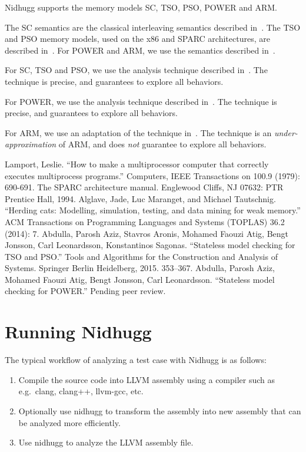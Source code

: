 \documentclass[a4paper]{article}
\begin{document}
Nidhugg supports the memory models SC, TSO, PSO, POWER and ARM.

The SC semantics are the classical interleaving semantics described
in~\cite{lamport1979make}. The TSO and PSO memory models, used on the
x86 and SPARC architectures, are described in~\cite{sparcv9}. For
POWER and ARM, we use the semantics described in~\cite{alglaveHerding}.

For SC, TSO and PSO, we use the analysis technique described
in~\cite{leonardssonSMCTSO}. The technique is precise, and guarantees
to explore all behaviors.

For POWER, we use the analysis technique described
in~\cite{leonardssonRSMCPOWER}. The technique is precise, and
guarantees to explore all behaviors.

For ARM, we use an adaptation of the technique
in~\cite{leonardssonRSMCPOWER}. The technique is an
\emph{under-approximation} of ARM, and does \emph{not} guarantee to
explore all behaviors.

\begin{thebibliography}{99}
  Lamport, Leslie. ``How to make a multiprocessor computer that correctly executes multiprocess programs.'' Computers, IEEE Transactions on 100.9 (1979): 690-691.
  The SPARC architecture manual. Englewood Cliffs, NJ 07632: PTR Prentice Hall, 1994.
  Alglave, Jade, Luc Maranget, and Michael Tautschnig. ``Herding cats: Modelling, simulation, testing, and data mining for weak memory.'' ACM Transactions on Programming Languages and Systems (TOPLAS) 36.2 (2014): 7.
  Abdulla, Parosh Aziz, Stavros Aronis, Mohamed Faouzi Atig, Bengt Jonsson, Carl Leonardsson, Konstantinos Sagonas. ``Stateless model checking for TSO and PSO.'' Tools and Algorithms for the Construction and Analysis of Systems. Springer Berlin Heidelberg, 2015. 353--367.
  Abdulla, Parosh Aziz, Mohamed Faouzi Atig, Bengt Jonsson, Carl Leonardsson. ``Stateless model checking for POWER.'' Pending peer review.
\end{thebibliography}

\section{Running Nidhugg}

The typical workflow of analyzing a test case with Nidhugg is as
follows:

\begin{enumerate}
\item Compile the source code into LLVM assembly using a compiler
  such as e.g.\ clang, clang++, llvm-gcc, etc.
\item Optionally use \textsf{nidhugg} to transform the assembly into
  new assembly that can be analyzed more efficiently.
\item Use \textsf{nidhugg} to analyze the LLVM assembly file.
\end{enumerate}
\end{document}
